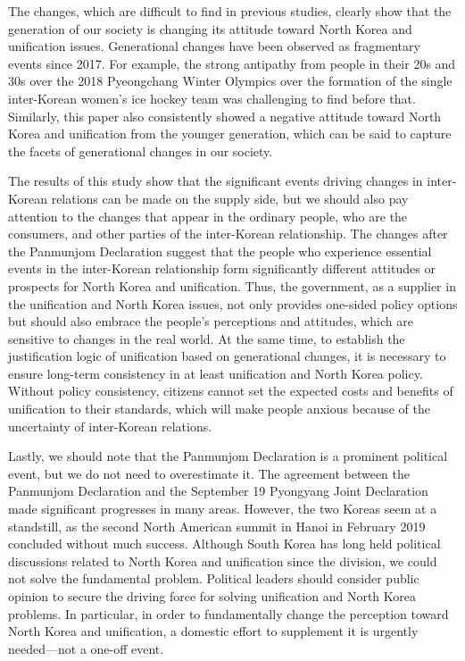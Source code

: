 \documentclass[letterpaper,9pt,twocolumn,twoside,]{pinp}
\begin{document}
The changes, which are difficult to find in previous studies, clearly
show that the generation of our society is changing its attitude toward
North Korea and unification issues. Generational changes have been
observed as fragmentary events since 2017. For example, the strong
antipathy from people in their 20s and 30s over the 2018 Pyeongchang
Winter Olympics over the formation of the single inter-Korean women's
ice hockey team was challenging to find before that. Similarly, this
paper also consistently showed a negative attitude toward North Korea
and unification from the younger generation, which can be said to
capture the facets of generational changes in our society.

The results of this study show that the significant events driving
changes in inter-Korean relations can be made on the supply side, but we
should also pay attention to the changes that appear in the ordinary
people, who are the consumers, and other parties of the inter-Korean
relationship. The changes after the Panmunjom Declaration suggest that
the people who experience essential events in the inter-Korean
relationship form significantly different attitudes or prospects for
North Korea and unification. Thus, the government, as a supplier in the
unification and North Korea issues, not only provides one-sided policy
options but should also embrace the people's perceptions and attitudes,
which are sensitive to changes in the real world. At the same time, to
establish the justification logic of unification based on generational
changes, it is necessary to ensure long-term consistency in at least
unification and North Korea policy. Without policy consistency, citizens
cannot set the expected costs and benefits of unification to their
standards, which will make people anxious because of the uncertainty of
inter-Korean relations.

Lastly, we should note that the Panmunjom Declaration is a prominent
political event, but we do not need to overestimate it. The agreement
between the Panmunjom Declaration and the September 19 Pyongyang Joint
Declaration made significant progresses in many areas. However, the two
Koreas seem at a standstill, as the second North American summit in
Hanoi in February 2019 concluded without much success. Although South
Korea has long held political discussions related to North Korea and
unification since the division, we could not solve the fundamental
problem. Political leaders should consider public opinion to secure the
driving force for solving unification and North Korea problems. In
particular, in order to fundamentally change the perception toward North
Korea and unification, a domestic effort to supplement it is urgently
needed---not a one-off event.





\end{document}

